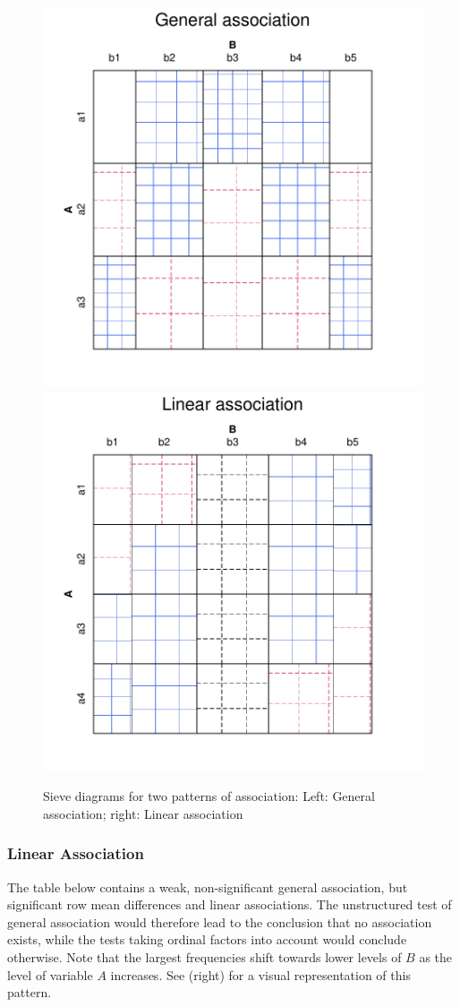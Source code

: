 \documentclass[10pt,krantz2]{krantz}\usepackage[]{graphicx}\usepackage[]{color}
\newenvironment{knitrout}{}{} %
\renewenvironment{knitrout}{\small\renewcommand{\baselinestretch}{.85}}{} %
\begin{document}
\begin{knitrout}
\color{fgcolor}\begin{figure}[!htbp]

\centerline{\includegraphics[width=.49\textwidth]{ch04/fig/cmhdemo-1} 
\includegraphics[width=.49\textwidth]{ch04/fig/cmhdemo-2} }

\caption[Sieve diagrams for two patterns of association]{Sieve diagrams for two patterns of association: Left: General association; right: Linear association\label{fig:cmhdemo}}
\end{figure}


\end{knitrout}


\subsubsection{Linear Association}

The table below contains a weak,
non-significant general association, but significant row mean
differences and linear associations.
The unstructured test of general association would therefore
lead to the conclusion that no association exists, while the
tests taking ordinal factors into account would conclude otherwise.
Note that the largest frequencies
shift towards lower levels of $B$ as the level of variable $A$ increases.
See  (right) for a visual representation of this pattern.
\end{document}
